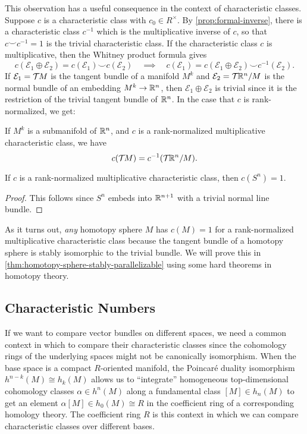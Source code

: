 This observation has a useful consequence in the context of characteristic classes. Suppose $c$ is a characteristic class with $c_0\in R^\times$. By \cref{prop:formal-inverse}, there is a characteristic class $c^{-1}$ which is the multiplicative inverse of $c$, so that $c\smile c^{-1}=1$ is the trivial characteristic class. If the characteristic class $c$ is multiplicative, then the Whitney product formula gives
\[
	c(\mathcal{E}_1\oplus\mathcal{E}_2)	 = c(\mathcal{E}_1)\smile c(\mathcal{E}_2)
	\quad\implies\quad
	c(\mathcal{E}_1) = c(\mathcal{E}_1\oplus \mathcal{E}_2) \smile c^{-1}(\mathcal{E}_2).
\]
If $\mathcal{E}_1={\mathcal{T}\hspace{-0.1em}} M$ is the tangent bundle of a manifold $M^k$ and $\mathcal{E}_2={\mathcal{T}\hspace{-0.1em}}\mathbb{R}^{n}/M$ is the normal bundle of an embedding $M^k\to \mathbb{R}^{n}$, then $\mathcal{E}_1\oplus \mathcal{E}_2$ is trivial since it is the restriction of the trivial tangent bundle of $\mathbb{R}^n$. In the case that $c$ is rank-normalized, we get:
\begin{theorem}\label{thm:whitney-duality}
	If $M^k$ is a submanifold of $\mathbb{R}^n$, and $c$ is a rank-normalized multiplicative characteristic class, we have
	\[
		c({\mathcal{T}\hspace{-0.1em}} M) = c^{-1}({\mathcal{T}\hspace{-0.1em}} \mathbb{R}^n/M).
	\]
\end{theorem}

\begin{corollary}
	If $c$ is a rank-normalized multiplicative characteristic class, then $c(S^n)=1$.
\end{corollary}
\begin{proof}
	This follows since $S^n$ embeds into $\mathbb{R}^{n+1}$ with a trivial normal line bundle.
\end{proof}

\begin{remark}
	As it turns out, \emph{any} homotopy sphere $M$ has $c(M)=1$ for a rank-normalized multiplicative characteristic class because the tangent bundle of a homotopy sphere is stably isomorphic to the trivial bundle. We will prove this in \cref{thm:homotopy-sphere-stably-parallelizable} using some hard theorems in homotopy theory.
\end{remark}

\subsection{Characteristic Numbers}

If we want to compare vector bundles on different spaces, we need a common context in which to compare their characteristic classes since the cohomology rings of the underlying spaces might not be canonically isomorphism. When the base space is a compact $R$-oriented manifold, the Poincar\'e duality isomorphism $h^{n-k}(M) \cong h_k(M)$ allows us to ``integrate'' homogeneous top-dimensional cohomology classes $\alpha\in h^{n}(M)$ along a fundamental class $[M]\in h_n(M)$ to get an element $\alpha[M]\in h_0(M)\cong R$ in the coefficient ring of a corresponding homology theory. The coefficient ring $R$ is this context in which we can compare characteristic classes over different bases.

